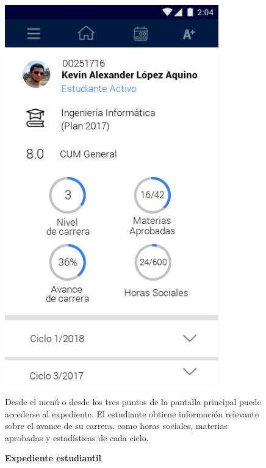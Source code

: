 \documentclass[12pt]{article}
\begin{document}
\begin{figure}[t]
	\begin{minipage}[t]{0.45\textwidth}
		\centering
		\caption{\textbf{Expediente estudiantil}}
		\includegraphics[width=0.825\textwidth]{img/8.png}
	\end{minipage}\hfill
	\begin{minipage}[t]{0.45\textwidth}
		\vspace*{10mm}
		Desde el menú o desde los tres puntos de la pantalla principal puede accederse al expediente. El estudiante obtiene información relevante sobre el avance de su carrera, como horas sociales, materias aprobadas y estadísticas de cada ciclo.
	\end{minipage}
	

\end{figure}
\end{document}
